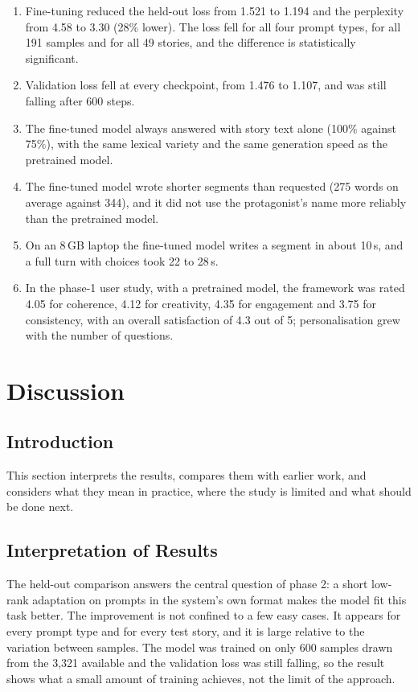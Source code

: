 \begin{enumerate}
    \item Fine-tuning reduced the held-out loss from 1.521 to 1.194 and the perplexity from 4.58 to 3.30 (28\% lower). The loss fell for all four prompt types, for all 191 samples and for all 49 stories, and the difference is statistically significant.
    \item Validation loss fell at every checkpoint, from 1.476 to 1.107, and was still falling after 600 steps.
    \item The fine-tuned model always answered with story text alone (100\% against 75\%), with the same lexical variety and the same generation speed as the pretrained model.
    \item The fine-tuned model wrote shorter segments than requested (275 words on average against 344), and it did not use the protagonist's name more reliably than the pretrained model.
    \item On an 8\,GB laptop the fine-tuned model writes a segment in about 10\,s, and a full turn with choices took 22 to 28\,s.
    \item In the phase-1 user study, with a pretrained model, the framework was rated 4.05 for coherence, 4.12 for creativity, 4.35 for engagement and 3.75 for consistency, with an overall satisfaction of 4.3 out of 5; personalisation grew with the number of questions.
\end{enumerate}

\section{Discussion}
\label{sec:res-discussion}

\subsection{Introduction}

This section interprets the results, compares them with earlier work, and considers what they mean in practice, where the study is limited and what should be done next.

\subsection{Interpretation of Results}

The held-out comparison answers the central question of phase 2: a short low-rank adaptation on prompts in the system's own format makes the model fit this task better. The improvement is not confined to a few easy cases. It appears for every prompt type and for every test story, and it is large relative to the variation between samples. The model was trained on only 600 samples drawn from the 3,321 available and the validation loss was still falling, so the result shows what a small amount of training achieves, not the limit of the approach.

